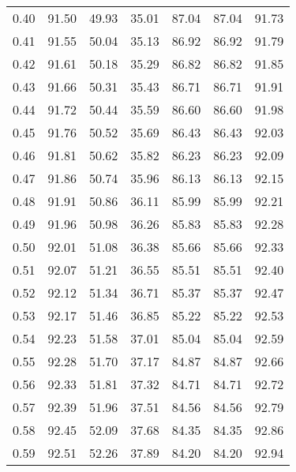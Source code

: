 \begin{tabular}{|c|c|c|c|c|c|c|}
      0.40 &     91.50 &     49.93 &      35.01 &   87.04 &      87.04 &         91.73 \\
      0.41 &     91.55 &     50.04 &      35.13 &   86.92 &      86.92 &         91.79 \\
      0.42 &     91.61 &     50.18 &      35.29 &   86.82 &      86.82 &         91.85 \\
      0.43 &     91.66 &     50.31 &      35.43 &   86.71 &      86.71 &         91.91 \\
      0.44 &     91.72 &     50.44 &      35.59 &   86.60 &      86.60 &         91.98 \\
      0.45 &     91.76 &     50.52 &      35.69 &   86.43 &      86.43 &         92.03 \\
      0.46 &     91.81 &     50.62 &      35.82 &   86.23 &      86.23 &         92.09 \\
      0.47 &     91.86 &     50.74 &      35.96 &   86.13 &      86.13 &         92.15 \\
      0.48 &     91.91 &     50.86 &      36.11 &   85.99 &      85.99 &         92.21 \\
      0.49 &     91.96 &     50.98 &      36.26 &   85.83 &      85.83 &         92.28 \\
      0.50 &     92.01 &     51.08 &      36.38 &   85.66 &      85.66 &         92.33 \\
      0.51 &     92.07 &     51.21 &      36.55 &   85.51 &      85.51 &         92.40 \\
      0.52 &     92.12 &     51.34 &      36.71 &   85.37 &      85.37 &         92.47 \\
      0.53 &     92.17 &     51.46 &      36.85 &   85.22 &      85.22 &         92.53 \\
      0.54 &     92.23 &     51.58 &      37.01 &   85.04 &      85.04 &         92.59 \\
      0.55 &     92.28 &     51.70 &      37.17 &   84.87 &      84.87 &         92.66 \\
      0.56 &     92.33 &     51.81 &      37.32 &   84.71 &      84.71 &         92.72 \\
      0.57 &     92.39 &     51.96 &      37.51 &   84.56 &      84.56 &         92.79 \\
      0.58 &     92.45 &     52.09 &      37.68 &   84.35 &      84.35 &         92.86 \\
      0.59 &     92.51 &     52.26 &      37.89 &   84.20 &      84.20 &         92.94 \\

\end{tabular}
